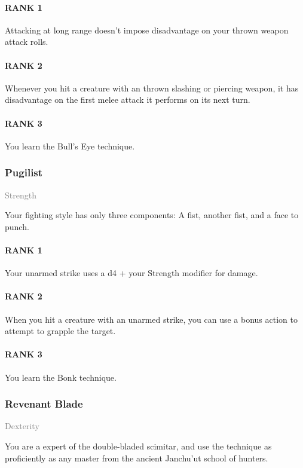 \paragraph{RANK 1} Attacking at long range doesn't impose disadvantage on your thrown weapon attack rolls.
\paragraph{RANK 2} Whenever you hit a creature with an thrown slashing or piercing weapon, it has disadvantage on the first melee attack it performs on its next turn.
\paragraph{RANK 3} You learn the Bull's Eye technique.

\subsubsection{Pugilist} \label{feat::pugilist}
\small{\textcolor{gray}{Strength}}

\normalsize
Your fighting style has only three components:
A fist, another fist, and a face to punch.
\paragraph{RANK 1} Your unarmed strike uses a d4 + your Strength modifier for damage.
\paragraph{RANK 2} When you hit a creature with an unarmed strike, you can use a bonus action to attempt to grapple the target.
\paragraph{RANK 3} You learn the Bonk technique.

\subsubsection{Revenant Blade} \label{feat::revenantblade}
\small{\textcolor{gray}{Dexterity}}

\normalsize
You are a expert of the double-bladed scimitar, and use the technique as proficiently as any master from the ancient Janchu'ut school of hunters.
